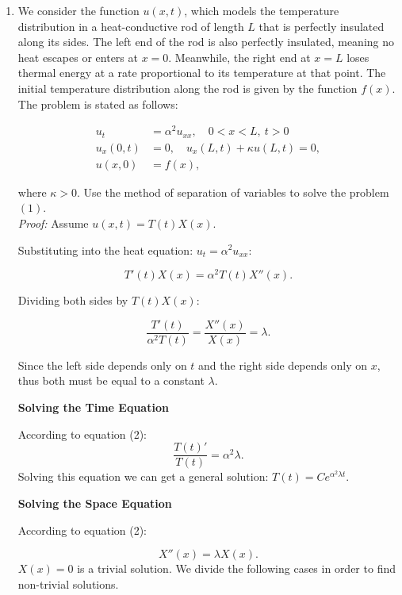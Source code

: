 \documentclass[letterpaper,12pt]{article}
\begin{document}

\begin{enumerate}[Q(1)]
\item 
We consider the function \( u(x,t) \), which models the temperature distribution in a heat-conductive rod of length \( L \) that is perfectly insulated along its sides. The left end of the rod is also perfectly insulated, meaning no heat escapes or enters at \( x = 0 \). Meanwhile, the right end at \( x = L \) loses thermal energy at a rate proportional to its temperature at that point. The initial temperature distribution along the rod is given by the function \( f(x) \). The problem is stated as follows:

\begin{equation}
\begin{aligned}
    u_t &= \alpha^2 u_{xx}, \quad 0 < x < L, \ t > 0 \\
    u_x(0,t) &= 0, \quad u_x(L,t) + \kappa u(L,t) = 0, \\
    u(x,0) &= f(x),
\end{aligned}
\end{equation}

where \( \kappa > 0 \). Use the method of separation of variables to solve the problem \((1)\).
\\

\textit{Proof:}
Assume $u(x,t) = T(t)X(x)$.

Substituting into the heat equation: $u_t = \alpha^2 u_{xx}$:

\[
    T'(t)X(x) = \alpha^2 T(t) X''(x).
\]

Dividing both sides by \( T(t)X(x) \):

\[
    \frac{T'(t)}{\alpha^2 T(t)} = \frac{X''(x)}{X(x)} = \lambda. \tag{2}
\]

Since the left side depends only on \( t \) and the right side depends only on \( x \), thus both must be equal to a constant \( \lambda \).

\textbf{Solving the Time Equation}

According to equation (2):
\[
    \frac{T(t)'}{T(t)} = \alpha^2 \lambda.
\]
Solving this equation we can get a general solution: $T(t) = C e^{\alpha^2 \lambda t}$.

\textbf{Solving the Space Equation}

According to equation (2):

\[
    X''(x) = \lambda X(x).
\]
$X(x)=0$ is a trivial solution. We divide the following cases in order to find non-trivial solutions.


\end{enumerate}
\end{document}
